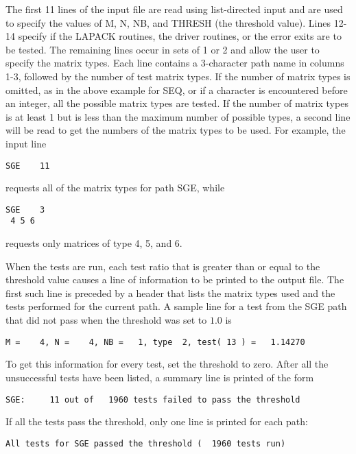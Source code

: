 The first 11 lines of the input file are read using list-directed
input and are used to specify the values of M, N,
NB, and THRESH (the threshold value). Lines 12-14 specify if the LAPACK
routines, the driver routines, or the error exits are to be tested.
The remaining lines occur in sets of 1 or 2 and allow
the user to specify the matrix types.  Each line contains
a 3-character path name in columns 1-3, followed by the number of test
matrix types.  If the number of matrix types is omitted, as in the
above example for SEQ, or if a character is encountered before an
integer, all the possible matrix types are tested.
If the number of matrix types is at least 1 but is less than the maximum
number of possible types, a second line will be read to get
the numbers of the matrix types to be used.  For example, the input line
\begin{verbatim}
SGE    11
\end{verbatim}
requests all of the matrix types for path SGE, while
\begin{verbatim}
SGE    3
 4 5 6 
\end{verbatim}
requests only matrices of type 4, 5, and 6.

When the tests are run, each test ratio that is greater than or
equal to the threshold value causes a line of information to be
printed to the output file.
The first such line is preceded by a header that lists the matrix
types used and the tests performed for the current path.
A sample line for a test from the SGE path
that did not pass when the threshold was set to $1.0$ is

\begin{verbatim}
M =    4, N =    4, NB =   1, type  2, test( 13 ) =   1.14270
\end{verbatim}

\noindent
To get this information for every test, set the threshold to zero.
After all the unsuccessful tests have been listed, a summary line is
printed of the form

\begin{verbatim}
SGE:     11 out of   1960 tests failed to pass the threshold
\end{verbatim}

\noindent
If all the tests pass the
threshold, only one line is printed for each path:

\begin{verbatim}
All tests for SGE passed the threshold (  1960 tests run)
\end{verbatim}

